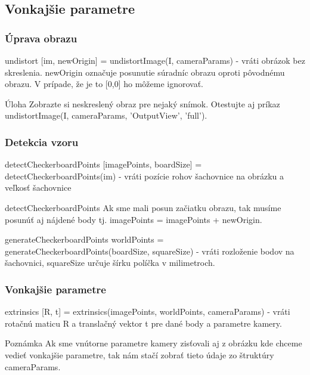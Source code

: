 \documentclass{beamer}
\begin{document}
\subsection{Vonkajšie parametre}
\begin{frame}
\frametitle{Úprava obrazu}
\begin{block}{undistort}
[im, newOrigin] = undistortImage(I, cameraParams) - vráti obrázok bez skreslenia. newOrigin označuje posunutie súradníc obrazu oproti pôvodnému obrazu. V prípade, že je to [0,0] ho môžeme ignorovať.
\end{block}

\begin{block}{Úloha}
Zobrazte si neskreslený obraz pre nejaký snímok. Otestujte aj príkaz undistortImage(I, cameraParams, 'OutputView', 'full').
\end{block}

\end{frame}

\begin{frame}
\frametitle{Detekcia vzoru}
\begin{block}{detectCheckerboardPoints}
[imagePoints, boardSize] = detectCheckerboardPoints(im) - vráti pozície rohov šachovnice na obrázku a veľkosť šachovnice
\end{block}

\begin{alertblock}{detectCheckerboardPoints}
Ak sme mali posun začiatku obrazu, tak musíme posunúť aj nájdené body tj. imagePoints = imagePoints + newOrigin.
\end{alertblock}

\begin{block}{generateCheckerboardPoints}
worldPoints = generateCheckerboardPoints(boardSize, squareSize) - vráti rozloženie bodov na šachovnici, squareSize určuje šírku políčka v milimetroch.
\end{block}
\end{frame}

\begin{frame}
\frametitle{Vonkajšie parametre}

\begin{block}{extrinsics}
[R, t] = extrinsics(imagePoints, worldPoints, cameraParams) - vráti rotačnú maticu R a translačný vektor t pre dané body a parametre kamery.
\end{block}

\begin{block}{Poznámka}
Ak sme vnútorne parametre kamery zisťovali aj z obrázku kde chceme vedieť vonkajšie parametre, tak nám stačí zobrať tieto údaje zo štruktúry cameraParams.
\end{block}
\end{frame}
\end{document}
